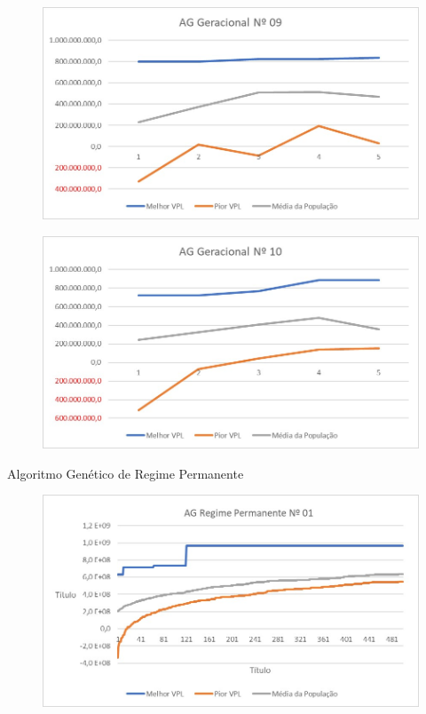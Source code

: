 \documentclass[12pt,a4paper]{report}
\begin{document}
\begin{figure}[H]
\centering

\includegraphics[scale=1]{AGG/9}

\end{figure}

\begin{figure}[H]
\centering

\includegraphics[scale=1]{AGG/10}

\end{figure}

Algoritmo Genético de Regime Permanente

\begin{figure}[H]
\centering

\includegraphics[scale=1]{AGRP/1}

\end{figure}
\end{document}
